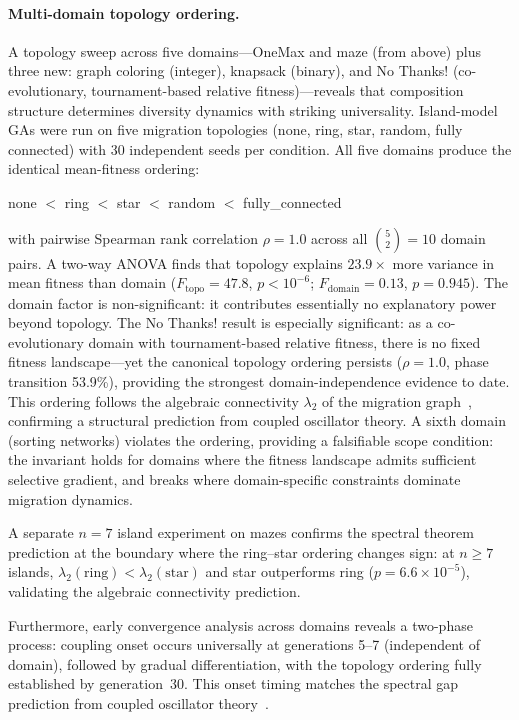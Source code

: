 \documentclass[sigconf]{acmart}
\begin{document}
\paragraph{Multi-domain topology ordering.}
A topology sweep across five domains---OneMax and maze (from above) plus three new: graph coloring (integer), knapsack (binary), and No Thanks! (co-evolutionary, tournament-based relative fitness)---reveals that composition structure determines diversity dynamics with striking universality. Island-model GAs were run on five migration topologies (none, ring, star, random, fully connected) with 30 independent seeds per condition. All five domains produce the identical mean-fitness ordering:
\begin{center}
\small
none $<$ ring $<$ star $<$ random $<$ fully\_connected
\end{center}
\noindent with pairwise Spearman rank correlation $\rho = 1.0$ across all $\binom{5}{2} = 10$ domain pairs. A two-way ANOVA finds that topology explains $23.9\times$ more variance in mean fitness than domain ($F_{\mathrm{topo}} = 47.8$, $p < 10^{-6}$; $F_{\mathrm{domain}} = 0.13$, $p = 0.945$). The domain factor is non-significant: it contributes essentially no explanatory power beyond topology. The No Thanks! result is especially significant: as a co-evolutionary domain with tournament-based relative fitness, there is no fixed fitness landscape---yet the canonical topology ordering persists ($\rho = 1.0$, phase transition 53.9\%), providing the strongest domain-independence evidence to date. This ordering follows the algebraic connectivity $\lambda_2$ of the migration graph~\cite{sanz2026algebraic}, confirming a structural prediction from coupled oscillator theory. A sixth domain (sorting networks) violates the ordering, providing a falsifiable scope condition: the invariant holds for domains where the fitness landscape admits sufficient selective gradient, and breaks where domain-specific constraints dominate migration dynamics.

A separate $n{=}7$ island experiment on mazes confirms the spectral theorem prediction at the boundary where the ring--star ordering changes sign: at $n{\geq}7$ islands, $\lambda_2(\text{ring}) < \lambda_2(\text{star})$ and star outperforms ring ($p = 6.6{\times}10^{-5}$), validating the algebraic connectivity prediction.

Furthermore, early convergence analysis across domains reveals a two-phase process: coupling onset occurs universally at generations 5--7 (independent of domain), followed by gradual differentiation, with the topology ordering fully established by generation~30. This onset timing matches the spectral gap prediction from coupled oscillator theory~\cite{sanz2026algebraic}.
\end{document}
